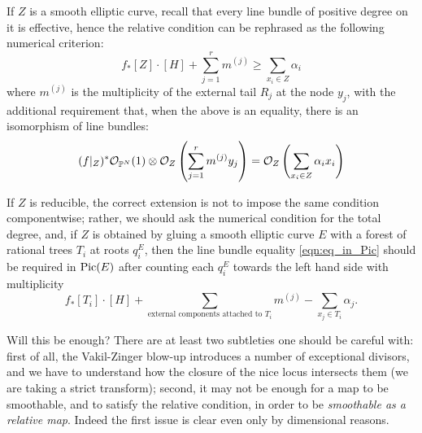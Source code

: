 \begin{rmk}
If $Z$ is a smooth elliptic curve, recall that every line bundle of positive degree on it is effective, hence the relative condition can be rephrased as the following numerical criterion:
\begin{equation*} f_*[Z]\cdot [H]+\sum_{j=1}^r m^{(j)}\geq \sum_{x_i\in Z}\alpha_i \end{equation*}
where $m^{(j)}$ is the multiplicity of the external tail $R_j$ at the node $y_j$, with the additional requirement that, when the above is an equality, there is an isomorphism of line bundles:
\begin{equation}\label{eqn:eq_in_Pic}
(f|_{Z})^*\mathcal{O}_{\mathbb P^N}(1) \otimes \mathcal{O}_Z\left(\sum_{j=1}^r m^{(j)}y_j\right)=\mathcal{O}_Z\left(\sum_{x_i\in Z}\alpha_ix_i\right) 
\end{equation}
 
 If $Z$ is reducible, the correct extension is not to impose the same condition componentwise; rather, we should ask the numerical condition for the total degree, and, if $Z$ is obtained by gluing a smooth elliptic curve $E$ with a forest of rational trees $T_i$ at roots $q^E_i$, then the line bundle equality \eqref{eqn:eq_in_Pic} should be required in $\operatorname{Pic}(E)$ after counting each $q^E_i$ towards the left hand side with multiplicity
 \[f_*[T_i]\cdot [H]+\sum_{\text{external components attached to $T_i$}} m^{(j)}- \sum_{x_j\in T_i}\alpha_j.\]
 
\end{rmk}
Will this be enough? There are at least two subtleties one should be careful with: first of all, the Vakil-Zinger blow-up introduces a number of exceptional divisors, and we have to understand how the closure of the nice locus intersects them (we are taking a strict transform); second, it may not be enough for a map to be smoothable, and to satisfy the relative condition, in order to be \emph{smoothable as a relative map}. Indeed the first issue is clear even only by dimensional reasons.

